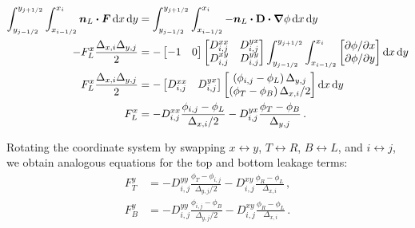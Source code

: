 \begin{align*}
\int_{y_{j-1/2}}^{y_{j+1/2}} \int_{x_{i-1/2}}^{x_{i}}
\vec{n}_L \vd \vec{F}
\ud x \ud y
&=
\int_{y_{j-1/2}}^{y_{j+1/2}} \int_{x_{i-1/2}}^{x_{i}}
-\vec{n}_L \vd \Dtens \vd \grad \phi
\ud x \ud y
\\
-F_L^x \frac{\Delta_{x,i} \Delta_{y,j}}{2}
&=
-
\begin{bmatrix}
  -1 & 0
\end{bmatrix}
\begin{bmatrix}
  D_{i,j}^{xx} & D_{i,j}^{yx} \\
  D_{i,j}^{xy} & D_{i,j}^{yy}
\end{bmatrix}
\int_{y_{j-1/2}}^{y_{j+1/2}} \int_{x_{i-1/2}}^{x_{i}}
\begin{bmatrix}
  \tpder{\phi}{x} \\
  \tpder{\phi}{y}
\end{bmatrix}
\ud x \ud y
\\
F_L^x \frac{\Delta_{x,i} \Delta_{y,j}}{2}
&=
-
\begin{bmatrix}
  D_{i,j}^{xx} & D_{i,j}^{yx}
\end{bmatrix}
\begin{bmatrix}
  \left( \phi_{i,j} - \phi_L \right) \Delta_{y,j} \\
  \left( \phi_T - \phi_B \right) \Delta_{x,i} / 2
\end{bmatrix}
\ud x \ud y
\\
F_L^x
&= 
- D_{i,j}^{xx} \frac{\phi_{i,j} - \phi_L}{ \Delta_{x,i} / 2}
- D_{i,j}^{yx} \frac{\phi_T - \phi_B}{ \Delta_{y,j} }\,.
\end{align*}

Rotating the coordinate system by swapping $x\leftrightarrow y$, $T
\leftrightarrow R$, $B \leftrightarrow L$, and $i \leftrightarrow j$, we obtain
analogous equations for the top and bottom leakage terms:
\begin{align*}
F_T^y
&= 
- D_{i,j}^{yy} \frac{\phi_T - \phi_{i,j}}{ \Delta_{y,j} / 2}
- D_{i,j}^{xy} \frac{\phi_R - \phi_L}{ \Delta_{x,i} }\,,
\\  
F_B^y
&= 
- D_{i,j}^{yy} \frac{\phi_{i,j} - \phi_B}{ \Delta_{y,j} / 2}
- D_{i,j}^{xy} \frac{\phi_R - \phi_L}{ \Delta_{x,i} }\,.
\end{align*}

